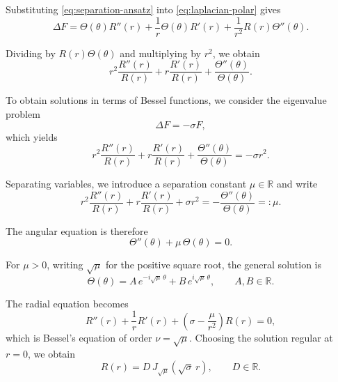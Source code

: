 \documentclass{article}
\begin{document}
Substituting \eqref{eq:separation-ansatz} into \eqref{eq:laplacian-polar} gives
\begin{equation}
\Delta F
= \Theta(\theta) R''(r)
+ \frac{1}{r}\Theta(\theta) R'(r)
+ \frac{1}{r^2} R(r)\Theta''(\theta).
\end{equation}

Dividing by \(R(r)\Theta(\theta)\) and multiplying by \(r^2\), we obtain
\begin{equation}
r^2 \frac{R''(r)}{R(r)}
+ r \frac{R'(r)}{R(r)}
+ \frac{\Theta''(\theta)}{\Theta(\theta)}.
\label{eq:pre-separation}
\end{equation}

To obtain solutions in terms of Bessel functions, we consider the eigenvalue problem
\begin{equation}
\Delta F = -\sigma F,
\label{eq:eigenvalue-problem}
\end{equation}
which yields
\begin{equation}
r^2 \frac{R''(r)}{R(r)}
+ r \frac{R'(r)}{R(r)}
+ \frac{\Theta''(\theta)}{\Theta(\theta)}
= -\sigma r^2.
\label{eq:separated-equation}
\end{equation}

Separating variables, we introduce a separation constant \(\mu \in \mathbb{R}\) and write
\begin{equation}
r^2 \frac{R''(r)}{R(r)}
+ r \frac{R'(r)}{R(r)}
+ \sigma r^2
= -\frac{\Theta''(\theta)}{\Theta(\theta)}
=: \mu.
\label{eq:separation-constant}
\end{equation}

The angular equation is therefore
\begin{equation}
\Theta''(\theta) + \mu\,\Theta(\theta) = 0.
\label{eq:angular-ode}
\end{equation}

For \(\mu > 0\), writing \(\sqrt{\mu}\) for the positive square root, the general solution is
\begin{equation}
\Theta(\theta)
= A\,e^{-i\sqrt{\mu}\,\theta}
+ B\,e^{i\sqrt{\mu}\,\theta},
\qquad A,B \in \mathbb{R}.
\label{eq:angular-solution}
\end{equation}

The radial equation becomes
\begin{equation}
R''(r) + \frac{1}{r}R'(r)
+ \left(\sigma - \frac{\mu}{r^2}\right) R(r) = 0,
\label{eq:radial-ode}
\end{equation}
which is Bessel’s equation of order \(\nu = \sqrt{\mu}\).
Choosing the solution regular at \(r=0\), we obtain
\begin{equation}
R(r) = D\,J_{\sqrt{\mu}}\!\left(\sqrt{\sigma}\,r\right),
\qquad D \in \mathbb{R}.
\label{eq:radial-solution}
\end{equation}
\end{document}

